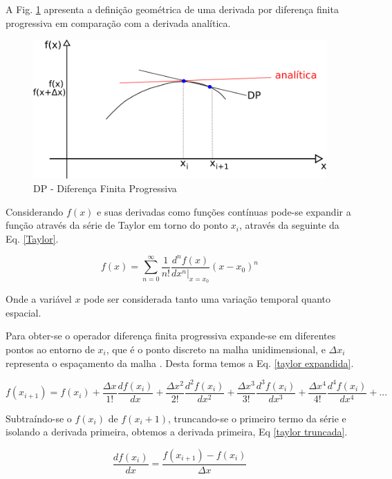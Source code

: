 \documentclass[12pt,a4paper,final]{report}%
\begin{document}
A Fig. \ref{DF} apresenta a definição geométrica de uma derivada por diferença finita progressiva em comparação com a derivada analítica.

\begin{figure}[H]
\centering
\includegraphics[scale=1.2]{Imagens/DP.png}
\caption{DP - Diferença Finita Progressiva}
\label{DF}
\end{figure}


Considerando $f(x)$ e suas derivadas como funções contínuas pode-se expandir a função através da série de Taylor em torno do ponto $x_{i}$, através da seguinte da Eq. \ref{Taylor}.

\begin{equation}
f(x)=\sum^{\infty}_{n=0}\frac{1}{n!}\frac{d^{n}f(x)}{dx^{n}|_{x=x_{0}}}(x-x_{0})^{n}
\label{Taylor}
\end{equation}

Onde a variável $x$ pode ser considerada tanto uma variação temporal quanto espacial.

Para obter-se o operador diferença finita progressiva expande-se em diferentes pontos ao entorno de $x_{i}$, que é o ponto discreto na malha unidimensional, e $\Delta x_{i}$ representa o espaçamento da malha \citep{Bartolo2010}. Desta forma temos a Eq. \ref{taylor expandida}.

\begin{equation}
f(x_{i+1})=f(x_{i}) + \frac{\Delta x}{1!}\frac{df(x_{i})}{dx}+\frac{\Delta x^{2}}{2!}\frac{d^{2}f(x_{i})}{dx^{2}}+\frac{\Delta x^{3}}{3!}\frac{d^{3}f(x_{i})}{dx^{3}}+\frac{\Delta x^{4}}{4!}\frac{d^{4}f(x_{i})}{dx^{4}}+...
\label{taylor expandida}
\end{equation}

Subtraíndo-se o $f(x_{i})$ de $f(x_{i}+1)$, truncando-se o primeiro termo da série e isolando a derivada primeira, obtemos a derivada primeira, Eq \ref{taylor truncada}.

\begin{equation}
\frac{df(x_{i})}{dx} = \frac{f(x_{i+1}) - f(x_{i})}{\Delta x}
\label{taylor truncada}
\end{equation}
\end{document}
